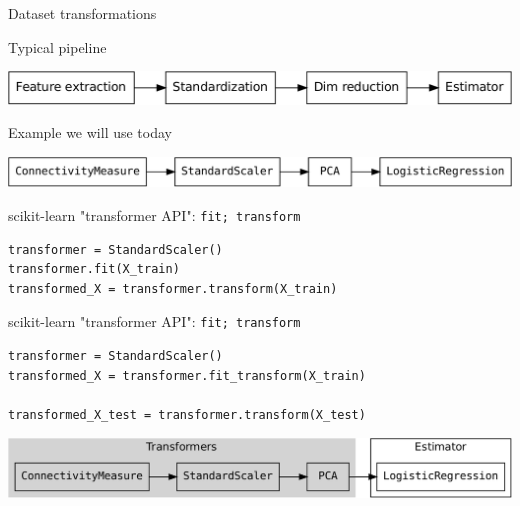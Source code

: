 \documentclass[presentation,mathserif,table]{beamer}
\begin{document}
\begin{frame}[label={sec:org7bfd6fb}]{Dataset transformations}
\begin{block}{Typical pipeline}
\begin{center}
\includegraphics[width=.9\linewidth]{pipeline.pdf}
\end{center}
\end{block}

\begin{block}{Example we will use today}
\begin{center}
\includegraphics[width=.9\linewidth]{pipeline_example.pdf}
\end{center}
\end{block}
\end{frame}
\begin{frame}[label={sec:org24c85c2},fragile]{scikit-learn "transformer API": \texttt{fit; transform}}
 \begin{verbatim}
transformer = StandardScaler()
transformer.fit(X_train)
transformed_X = transformer.transform(X_train)
\end{verbatim}
\end{frame}

\begin{frame}[label={sec:org5c2c47a},fragile]{scikit-learn "transformer API": \texttt{fit; transform}}
 \begin{verbatim}
transformer = StandardScaler()
transformed_X = transformer.fit_transform(X_train)

transformed_X_test = transformer.transform(X_test)
\end{verbatim}
\vfill
\begin{center}
\includegraphics[width=.9\linewidth]{pipeline_transformer_estimator.pdf}
\end{center}
\end{frame}
\end{document}
